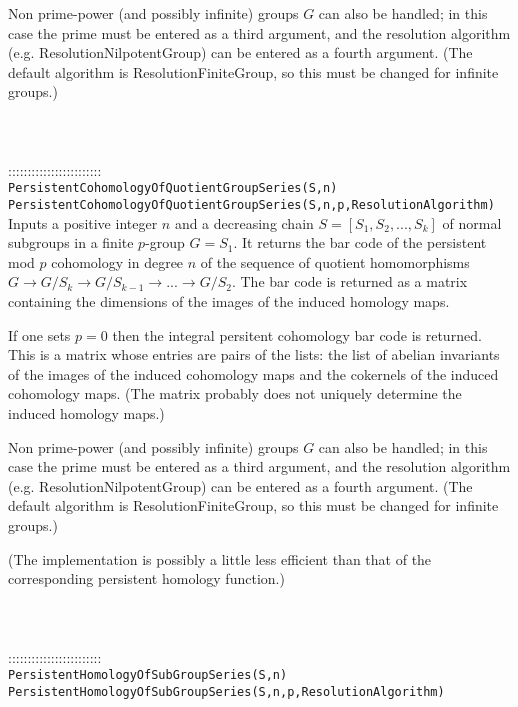 \documentclass[a4paper,11pt]{report}
\begin{document}
{ Non prime-power (and possibly infinite) groups $G$ can also be handled; in this case the prime must be entered as a third
argument, and the resolution algorithm (e.g. ResolutionNilpotentGroup) can be
entered as a fourth argument. (The default algorithm is ResolutionFiniteGroup,
so this must be changed for infinite groups.) \\
 \\
 \\
 \\
 ::::::::::::::::::::::::\\
 \texttt{PersistentCohomologyOfQuotientGroupSeries(S,n)}\\
 \texttt{PersistentCohomologyOfQuotientGroupSeries(S,n,p,Resolution{\textunderscore}Algorithm)}\\
 

 Inputs a positive integer $n$ and a decreasing chain $S=[S_1, S_2, ..., S_k]$ of normal subgroups in a finite $p$-group $G=S_1$. It returns the bar code of the persistent mod $p$ cohomology in degree $n$ of the sequence of quotient homomorphisms $G \rightarrow G/S_k \rightarrow G/S_{k-1} \rightarrow ... \rightarrow G/S_2 $. The bar code is returned as a matrix containing the dimensions of the images
of the induced homology maps. 

 If one sets $p=0$ then the integral persitent cohomology bar code is returned. This is a matrix
whose entries are pairs of the lists: the list of abelian invariants of the
images of the induced cohomology maps and the cokernels of the induced
cohomology maps. (The matrix probably does not uniquely determine the induced
homology maps.) 

 Non prime-power (and possibly infinite) groups $G$ can also be handled; in this case the prime must be entered as a third
argument, and the resolution algorithm (e.g. ResolutionNilpotentGroup) can be
entered as a fourth argument. (The default algorithm is ResolutionFiniteGroup,
so this must be changed for infinite groups.) 

 (The implementation is possibly a little less efficient than that of the
corresponding persistent homology function.) \\
 \\
 \\
 \\
 ::::::::::::::::::::::::\\
 \texttt{PersistentHomologyOfSubGroupSeries(S,n)}\\
 \texttt{PersistentHomologyOfSubGroupSeries(S,n,p,Resolution{\textunderscore}Algorithm)}\\
 

}
\end{document}
